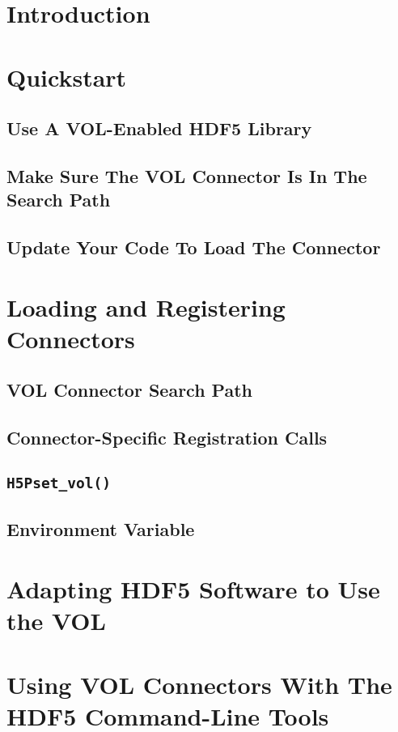 

\section{Introduction}

\section{Quickstart}
\subsection*{Use A VOL-Enabled HDF5 Library}
\subsection*{Make Sure The VOL Connector Is In The Search Path}
\subsection*{Update Your Code To Load The Connector}

\section{Loading and Registering Connectors}
\subsection{VOL Connector Search Path}
\subsection{Connector-Specific Registration Calls}
\subsection{\tt H5Pset\_vol()}
\subsection{Environment Variable}

\section{Adapting HDF5 Software to Use the VOL}

\section{Using VOL Connectors With The HDF5 Command-Line Tools}

